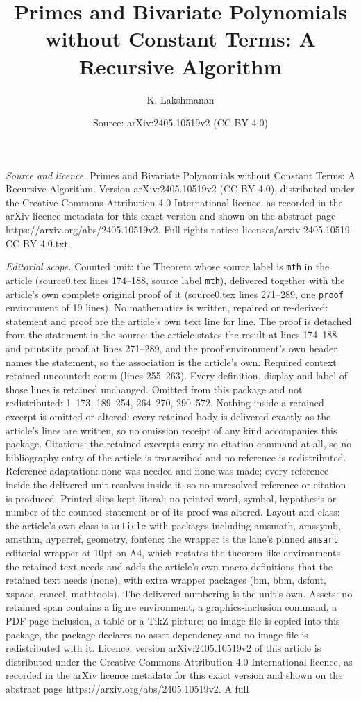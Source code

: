 \documentclass[10pt,a4paper]{amsart}
\title[Primes and Bivariate Polynomials without Constant Terms: A R]{Primes and Bivariate Polynomials without Constant Terms: A Recursive Algorithm}
\author{K. Lakshmanan}
\date{Source: arXiv:2405.10519v2 (CC BY 4.0)}
\begin{document}
\maketitle

\noindent\emph{Source and licence.} Primes and Bivariate Polynomials without Constant Terms: A Recursive Algorithm. Version arXiv:2405.10519v2 (CC BY 4.0), distributed under the Creative Commons Attribution 4.0 International licence, as recorded in the arXiv licence metadata for this exact version and shown on the abstract page https://arxiv.org/abs/2405.10519v2. Full rights notice: licenses/arxiv-2405.10519-CC-BY-4.0.txt.\par\smallskip

\noindent\textit{Editorial scope.} Counted unit: the Theorem whose source label is \texttt{mth} in the article (source0.tex lines 174--188, source label \texttt{mth}), delivered together with the article's own complete original proof of it (source0.tex lines 271--289, one \texttt{proof} environment of 19 lines). No mathematics is written, repaired or re-derived: statement and proof are the article's own text line for line. The proof is detached from the statement in the source: the article states the result at lines 174--188 and prints its proof at lines 271--289, and the proof environment's own header names the statement, so the association is the article's own. Required context retained uncounted: cor:m (lines 255--263). Every definition, display and label of those lines is retained unchanged. Omitted from this package and not redistributed: 1--173, 189--254, 264--270, 290--572. Nothing inside a retained excerpt is omitted or altered: every retained body is delivered exactly as the article's lines are written, so no omission receipt of any kind accompanies this package. Citations: the retained excerpts carry no citation command at all, so no bibliography entry of the article is transcribed and no reference is redistributed. Reference adaptation: none was needed and none was made; every reference inside the delivered unit resolves inside it, so no unresolved reference or citation is produced. Printed slips kept literal: no printed word, symbol, hypothesis or number of the counted statement or of its proof was altered. Layout and class: the article's own class is \texttt{article} with packages including amsmath, amssymb, amsthm, hyperref, geometry, fontenc; the wrapper is the lane's pinned \texttt{amsart} editorial wrapper at 10pt on A4, which restates the theorem-like environments the retained text needs and adds the article's own macro definitions that the retained text needs (none), with extra wrapper packages (bm, bbm, dsfont, xspace, cancel, mathtools). The delivered numbering is the unit's own. Assets: no retained span contains a figure environment, a graphics-inclusion command, a PDF-page inclusion, a table or a TikZ picture; no image file is copied into this package, the package declares no asset dependency and no image file is redistributed with it. Licence: version arXiv:2405.10519v2 of this article is distributed under the Creative Commons Attribution 4.0 International licence, as recorded in the arXiv licence metadata for this exact version and shown on the abstract page https://arxiv.org/abs/2405.10519v2. A full 
\end{document}
